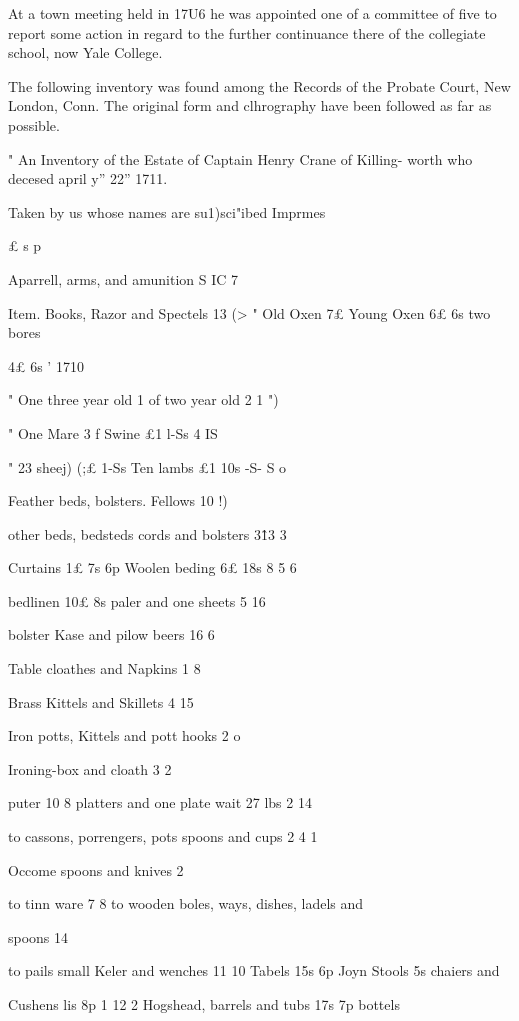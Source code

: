 At a town meeting held in 17U6 he was appointed one of a 
committee of five to report some action in regard to the further 
continuance there of the collegiate school, now Yale College. 

The following inventory was found among the Records of the 
Probate Court, New London, Conn. The original form and 
clhrography have been followed as far as possible. 

" An Inventory of the Estate of Captain Henry Crane of Killing- 
worth who decesed april y'' 22'' 1711. 

Taken by us whose names are su1)sci"ibed 
Imprmes 

£ s p 

Aparrell, arms, and amunition S  IC  7 

Item. Books, Razor and Spectels  13  (> 
" Old Oxen 7£ Young Oxen 6£  6s two bores 

4£ 6s ' 1710 

" One three year old 1 of two year old 2  1 ")  

" One Mare 3 f Swine £1  l-Ss 4  IS  

" 23 sheej) (;£ 1-Ss Ten lambs £1 10s -S- S o 

Feather beds, bolsters. Fellows 10  !)  

other beds, bedsteds cords and bolsters 3\^13  3 




Curtains 1£ 7s 6p Woolen beding 6£ 18s 8 5 6 

bedlinen 10£  8s paler and one sheets 5  16  

bolster Kase and pilow beers  16  6 

Table cloathes and Napkins 1  8  

Brass Kittels and Skillets 4  15  

Iron potts, Kittels and pott hooks 2  o  

Ironing-box and cloath  3  2 

puter 10  8 platters and one plate wait 27 lbs 2  14  

to cassons, porrengers, pots spoons and cups 2  4  1 

Occome spoons and knives  2  

to tinn ware  7  8 
to wooden boles, ways, dishes, ladels and 

spoons  14  

to pails small Keler and wenches  11  10 
Tabels 15s  6p Joyn Stools 5s chaiers and 

Cushens lis  8p 1  12  2 
Hogshead, barrels and tubs 17s  7p bottels 

